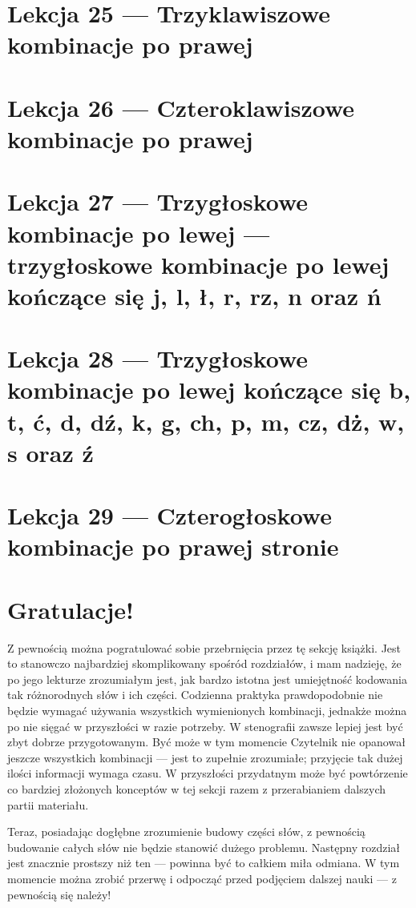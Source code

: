 \documentclass[12p, oneside]{book}
\begin{document}
\section{Lekcja 25 --- Trzyklawiszowe kombinacje po prawej}
\newpage
\section{Lekcja 26 --- Czteroklawiszowe kombinacje po prawej}
\newpage
\section{Lekcja 27 --- Trzygłoskowe kombinacje po lewej --- trzygłoskowe kombinacje po lewej kończące się j, l, ł, r, rz, n oraz ń}
\newpage
\section{Lekcja 28 --- Trzygłoskowe kombinacje po lewej kończące się b, t, ć, d, dź, k, g, ch, p, m, cz, dż, w, s oraz ź}

\newpage
\section{Lekcja 29 --- Czterogłoskowe kombinacje po prawej stronie}

\newpage
\section*{Gratulacje!}
Z pewnością można pogratulować sobie przebrnięcia przez tę sekcję książki. 
Jest to stanowczo najbardziej skomplikowany spośród rozdziałów, i mam nadzieję, że po jego lekturze
zrozumiałym jest, jak bardzo istotna jest umiejętność kodowania tak różnorodnych słów i ich części. Codzienna praktyka prawdopodobnie nie będzie wymagać używania wszystkich wymienionych kombinacji, jednakże można po nie sięgać w przyszłości w razie potrzeby. W stenografii zawsze lepiej jest być zbyt dobrze przygotowanym. Być może w tym momencie Czytelnik nie opanował jeszcze wszystkich kombinacji --- jest to zupełnie zrozumiałe; przyjęcie tak dużej ilości informacji wymaga czasu. W przyszłości przydatnym może być powtórzenie co bardziej złożonych konceptów w tej sekcji razem z przerabianiem dalszych partii materiału.

Teraz, posiadając dogłębne zrozumienie budowy części słów, z pewnością budowanie całych słów nie będzie stanowić dużego problemu. Następny rozdział jest znacznie prostszy niż ten --- powinna być to całkiem miła odmiana. W tym momencie można zrobić przerwę i odpocząć przed podjęciem dalszej nauki --- z pewnością się należy!
\newpage
\end{document}
